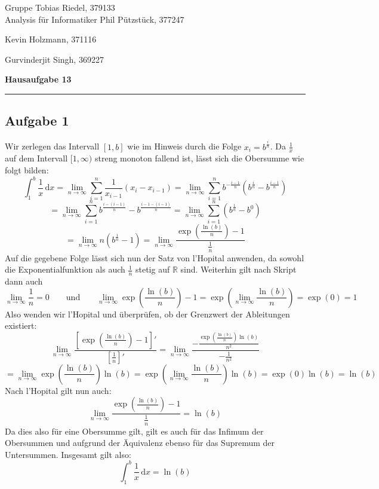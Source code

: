 \documentclass[a4paper,graphics,11pt]{article}
\newcommand{\aufgabe}[1]{\subsection*{Aufgabe #1}}
\begin{document}
\noindent Gruppe              \hfill Tobias Riedel, 379133 \\
\noindent Analysis für Informatiker             \hfill Phil Pützstück, 377247 \\
\strut\hfill Kevin Holzmann, 371116\\
\strut\hfill Gurvinderjit Singh, 369227
\begin{center}
	\LARGE{\textbf{Hausaufgabe  13}}
\end{center}
\begin{center}
\rule[0.1ex]{\textwidth}{1pt}
\end{center}



\aufgabe{1}
Wir zerlegen das Intervall $[1,b]$ wie im Hinweis durch die Folge $x_i = b^{\frac{i}{n}}$. Da 
$\frac{1}{x}$ auf dem Intervall $[1,\infty)$ streng monoton fallend ist, lässt sich die Obersumme wie folgt bilden:
$$
	\int_{1}^{b} \frac{1}{x}\, \mathrm{d}x
	= \lim_{n \to \infty} \sum_{i=1}^{n} \frac{1}{x_{i-1}}(x_i-x_{i-1})
	= \lim_{n \to \infty} \sum_{i=1}^{n} b^{-\frac{i-1}{n}}\left(b^{\frac{i}{n}} - b^{\frac{i-1}{n}}\right)
$$$$
	= \lim_{n \to \infty} \sum_{i=1}^{n} b^{\frac{i-(i-1)}{n}}-b^{\frac{i-1-(i-1)}{n}}
	= \lim_{n \to \infty} \sum_{i=1}^{n}\left(b^{\frac{1}{n}}-b^0\right)
$$$$
	= \lim_{n \to \infty} n\left(b^{\frac{1}{n}}-1\right)
	= \lim_{n \to \infty} \frac{\exp\left(\frac{\ln(b)}{n}\right)-1}{\frac{1}{n}}
$$
Auf die gegebene Folge lässt sich nun der Satz von l'Hopital anwenden, da sowohl die Exponentialfunktion 
als auch $\frac{1}{n}$ stetig auf $\mathbb{R}$ sind. Weiterhin gilt nach Skript dann auch
$$
	\lim_{n \to \infty} \frac{1}{n} = 0\qquad\text{und}\qquad
	\lim_{n \to \infty} \exp\left(\frac{\ln(b)}{n}\right)-1
	= \exp\left(\lim_{n \to \infty}\frac{\ln(b)}{n}\right)
	= \exp(0) = 1
$$
Also wenden wir l'Hopital und überprüfen, ob der Grenzwert der Ableitungen existiert:
$$
	 \lim_{n \to \infty} \frac{\left[\exp\left(\frac{\ln(b)}{n}\right)-1\right]'}{\left[\frac{1}{n}\right]'}
	= \lim_{n \to \infty} \frac{-\frac{\exp\left(\frac{\ln(b)}{n}\right)\ln(b)}{n^2}}{-\frac{1}{n^2}}
$$$$
	= \lim_{n \to \infty} \exp\left(\frac{\ln(b)}{n}\right)\ln(b)
	= \exp\left(\lim_{n \to \infty} \frac{\ln(b)}{n}\right)\ln(b)
	= \exp(0)\ln(b) = \ln(b)
$$
Nach l'Hopital gilt nun auch:
$$
	\lim_{n \to \infty} \frac{\exp\left(\frac{\ln(b)}{n}\right)-1}{\frac{1}{n}} = \ln(b)
$$
Da dies also für eine Obersumme gilt, gilt es auch für das Infimum der Obersummen und aufgrund der Äquivalenz
ebenso für das Supremum der Untersummen. Insgesamt gilt also:
$$
	\int_{1}^{b} \frac{1}{x}\, \mathrm{d}x = \ln(b)
$$
\end{document}
